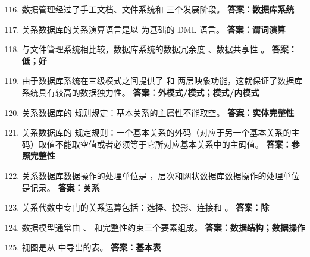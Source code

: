 \documentclass[12pt, a4paper]{article}
\begin{document}
\begin{enumerate}[label=\arabic*.]
    \setcounter{enumi}{115}
    \item 数据管理经过了手工文档、文件系统和 \underline{\hspace{2cm}} 三个发展阶段。
    \textbf{答案：数据库系统}

    \item 关系数据库的关系演算语言是以 \underline{\hspace{2cm}} 为基础的 DML 语言。
    \textbf{答案：谓词演算}

    \item 与文件管理系统相比较，数据库系统的数据冗余度 \underline{\hspace{2cm}} 、数据共享性 \underline{\hspace{2cm}} 。
    \textbf{答案：低；好}

    \item 由于数据库系统在三级模式之间提供了 \underline{\hspace{2cm}} 和 \underline{\hspace{2cm}} 两层映象功能，这就保证了数据库系统具有较高的数据独力性。
    \textbf{答案：外模式/模式；模式/内模式}

    \item 关系数据库的 \underline{\hspace{2cm}} 规则规定：基本关系的主属性不能取空。
    \textbf{答案：实体完整性}

    \item 关系数据库的 \underline{\hspace{2cm}} 规定规则：一个基本关系的外码（对应于另一个基本关系的主码）取值不能取空值或者必须等于它所对应基本关系中的主码值。
    \textbf{答案：参照完整性}

    \item 关系数据库数据操作的处理单位是 \underline{\hspace{2cm}} ，层次和网状数据库数据操作的处理单位是记录。
    \textbf{答案：关系}

    \item 关系代数中专门的关系运算包括：选择、投影、连接和 \underline{\hspace{2cm}} 。
    \textbf{答案：除}

    \item 数据模型通常由 \underline{\hspace{2cm}} 、 \underline{\hspace{2cm}} 和完整性约束三个要素组成。
    \textbf{答案：数据结构；数据操作}

    \item 视图是从 \underline{\hspace{2cm}} 中导出的表。
    \textbf{答案：基本表}


\end{enumerate}
\end{document}

